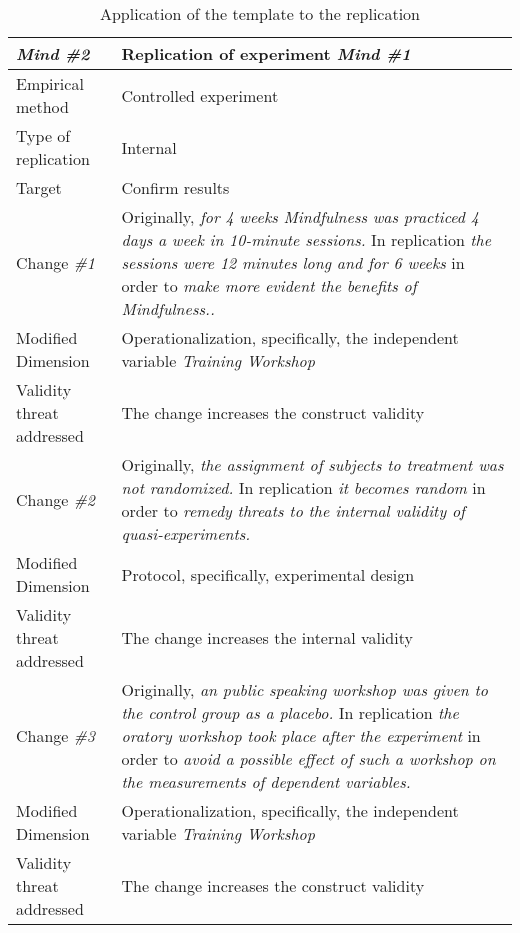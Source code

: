 
\begin{table}
\caption{Application of the template to the replication \cite{bernardez-jss-2016}}
\begin{tabular}{| p{3.3cm} | p{9cm} |}
\hline
\textbf { \textit{Mind}\textbf   { \textit{\#2} }} & Replication of experiment   \textit{Mind \#1}    \\  \hline
Empirical method &  Controlled experiment  \\  \hline
Type of replication &  Internal   \\  \hline
Target  &   Confirm results   \\  \hline \hline

Change \textit{\#1}   & \parbox[t]{9cm} {Originally,  \textit{for 4 weeks Mindfulness was practiced 4 days a week in 10-minute sessions.} } \parbox[t]{9cm}{In replication \textit{the sessions were 12 minutes long and for 6 weeks} }   in order to  \textit{make more evident the benefits of Mindfulness..} \\  \hline
Modified Dimension & 
Operationalization, specifically, the independent variable \textit {Training Workshop }  \\  \hline 
Validity threat addressed  &  The change increases the construct validity   \\  \hline
 \hline
Change \textit{\#2}   & \parbox[t]{9cm} {Originally,  \textit{the assignment of subjects to treatment was not randomized.} } \parbox[t]{9cm}{In replication \textit{it becomes random} }  in order to \textit{remedy threats to the internal validity of quasi-experiments.} \\  \hline
Modified Dimension & Protocol, specifically, experimental design \\  \hline 

Validity threat addressed  &  The change increases the internal validity   \\  \hline \hline

Change \textit{\#3}   & \parbox[t]{9cm} {Originally,  \textit{an public speaking workshop was given to the control group as a placebo.} } \parbox[t]{9cm}{In replication \textit{the oratory workshop took place after the experiment} } in order to  \textit{avoid a possible effect of such a workshop on the measurements of dependent variables.} \\  \hline
Modified Dimension & 
Operationalization, specifically, the independent variable \textit {Training Workshop }  \\  \hline 
Validity threat addressed  &  The change increases the construct validity   \\  \hline \hline


\end{tabular}
\end{table}
